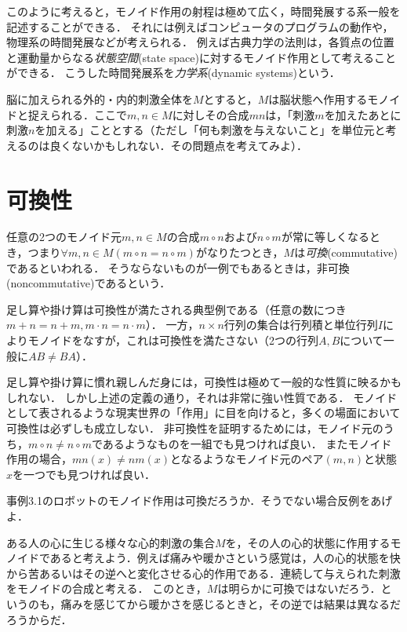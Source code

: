 \documentclass[11pt,a4paper]{jsarticle}
\begin{document}
このように考えると，モノイド作用の射程は極めて広く，時間発展する系一般を記述することができる．
それには例えばコンピュータのプログラムの動作や，物理系の時間発展などが考えられる．
例えば古典力学の法則は，各質点の位置と運動量からなる\emph{状態空間}(state space)に対するモノイド作用として考えることができる．
こうした時間発展系を\emph{力学系}(dynamic systems)という．



\begin{example}
    脳に加えられる外的・内的刺激全体を$M$とすると，$M$は脳状態へ作用するモノイドと捉えられる．ここで$m, n \in M$に対しその合成$mn$は，「刺激$m$を加えたあとに刺激$n$を加える」こととする（ただし「何も刺激を与えないこと」を単位元と考えるのは良くないかもしれない．その問題点を考えてみよ）．
\end{example}


\section{可換性}
任意の2つのモノイド元$m,n \in M$の合成$m \circ n$および$n \circ m$が常に等しくなるとき，つまり$\forall m,n \in M (m \circ n = n \circ m)$がなりたつとき，$M$は\emph{可換}(commutative)であるといわれる．
そうならないものが一例でもあるときは，非可換(noncommutative)であるという．

\begin{example}
    足し算や掛け算は可換性が満たされる典型例である（任意の数につき$m+n = n+m, m\cdot n = n\cdot m$）．
    一方，$n \times n$行列の集合は行列積と単位行列$I$によりモノイドをなすが，これは可換性を満たさない（2つの行列$A, B$について一般に$AB \neq BA$）．
\end{example}


足し算や掛け算に慣れ親しんだ身には，可換性は極めて一般的な性質に映るかもしれない．
しかし上述の定義の通り，それは非常に強い性質である．
モノイドとして表されるような現実世界の「作用」に目を向けると，多くの場面において可換性は必ずしも成立しない．
非可換性を証明するためには，モノイド元のうち，$m \circ n \neq n \circ m$であるようなものを一組でも見つければ良い．
またモノイド作用の場合，$mn(x) \neq nm(x)$となるようなモノイド元のペア$(m,n)$と状態$x$を一つでも見つければ良い．


\begin{exercise}
 事例3.1のロボットのモノイド作用は可換だろうか．そうでない場合反例をあげよ．
\end{exercise}


\begin{example}
    ある人の心に生じる様々な心的刺激の集合$M$を，その人の心的状態に作用するモノイドであると考えよう．例えば痛みや暖かさという感覚は，人の心的状態を快から苦あるいはその逆へと変化させる心的作用である．連続して与えられた刺激をモノイドの合成と考える．
    このとき，$M$は明らかに可換ではないだろう．というのも，痛みを感じてから暖かさを感じるときと，その逆では結果は異なるだろうからだ．
\end{example}
\end{document}
